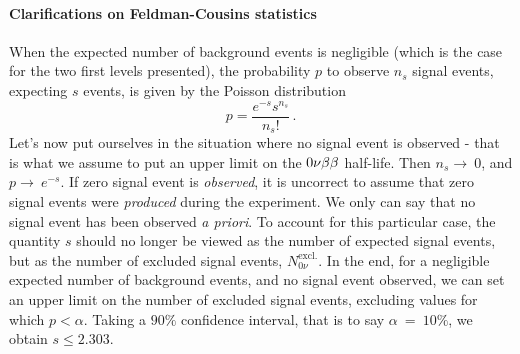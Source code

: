 \paragraph{Clarifications on Feldman-Cousins statistics}
When the expected number of background events is negligible (which is the case for the two first levels presented), the probability $p$ to observe $n_{s}$ signal events, expecting $s$ events, is given by the Poisson distribution
\begin{equation}
p = \frac{e^{-s}s^{n_{s}}}{n_{s}!}\,.
\end{equation}
Let's now put ourselves in the situation where no signal event is observed - that is what we assume to put an upper limit on the $0\nu\beta\beta$ half-life.
Then $n_{s}\rightarrow~0$, and $p\rightarrow~e^{-s}$.
If zero signal event is \emph{observed}, it is uncorrect to assume that zero signal events were \emph{produced} during the experiment.
We only can say that no signal event has been observed \emph{a priori}.
To account for this particular case, the quantity $s$ should no longer be viewed as the number of expected signal events, but as the number of excluded signal events, $N_{0\nu}^{\text{excl.}}$.
In the end, for a negligible expected number of background events, and no signal event observed, we can set an upper limit on the number of excluded signal events, excluding values for which $p < \alpha$.
Taking a $90\%$ confidence interval, that is to say $\alpha~=~10\%$, we obtain $s \leq 2.303$.

